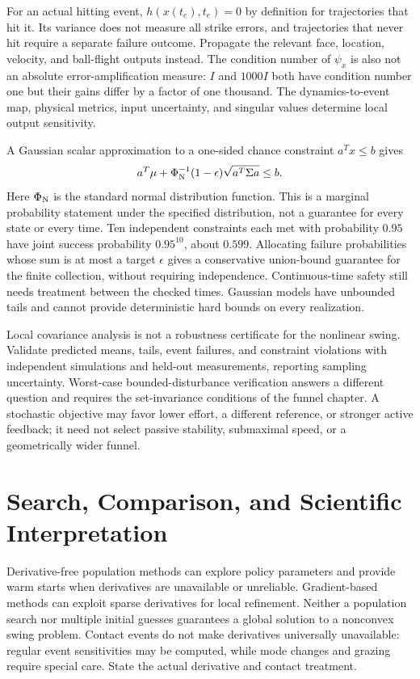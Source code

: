 \documentclass[12pt, openany]{book}
\theoremstyle{plain}
\begin{document}
For an actual hitting event, $h(x(t_e),t_e)=0$ by definition for trajectories
that hit it. Its variance does not measure all strike errors, and trajectories
that never hit require a separate failure outcome. Propagate the relevant
face, location, velocity, and ball-flight outputs instead. The condition
number of $\psi_x$ is also not an absolute error-amplification measure:
$I$ and $1000I$ both have condition number one but their gains differ by
a factor of one thousand. The dynamics-to-event map, physical metrics,
input uncertainty, and singular values determine local output sensitivity.

A Gaussian scalar approximation to a one-sided chance constraint
$a^Tx\leq b$ gives
\begin{equation}\label{eq:ocp_chance_constraint}
 a^T\mu+\Phi_{\rm N}^{-1}(1-\epsilon)
 \sqrt{a^T\Sigma a}\leq b.
\end{equation}
Here $\Phi_{\rm N}$ is the standard normal distribution function. This is a
marginal probability statement under the specified distribution, not a
guarantee for every state or every time. Ten independent constraints each
met with probability $0.95$ have joint success probability $0.95^{10}$,
about $0.599$. Allocating failure probabilities whose sum is at most a
target $\epsilon$ gives a conservative union-bound guarantee for the finite
collection, without requiring independence. Continuous-time safety still
needs treatment between the checked times. Gaussian models have unbounded
tails and cannot provide deterministic hard bounds on every realization.

Local covariance analysis is not a robustness certificate for the nonlinear
swing. Validate predicted means, tails, event failures, and constraint
violations with independent simulations and held-out measurements, reporting
sampling uncertainty. Worst-case bounded-disturbance verification answers
a different question and requires the set-invariance conditions of the
funnel chapter. A stochastic objective may favor lower effort, a different
reference, or stronger active feedback; it need not select passive stability,
submaximal speed, or a geometrically wider funnel.

\section{Search, Comparison, and Scientific Interpretation}

Derivative-free population methods can explore policy parameters and provide
warm starts when derivatives are unavailable or unreliable. Gradient-based
methods can exploit sparse derivatives for local refinement. Neither a
population search nor multiple initial guesses guarantees a global solution
to a nonconvex swing problem. Contact events do not make derivatives
universally unavailable: regular event sensitivities may be computed, while
mode changes and grazing require special care. State the actual derivative
and contact treatment.
\end{document}
